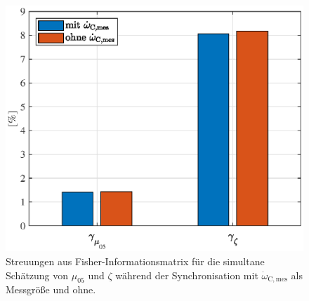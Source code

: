 \begin{figure}[ht]
  \centering
 \includegraphics[scale=0.9]{figures/03_Sensitivitaetsanalyse/03_Fisher_Info/Sync/mue05_zeta_Sync.eps}
  \caption{Streuungen aus Fisher-Informationsmatrix für die simultane Schätzung von $\mu_{05}$ und $\zeta$ während der Synchronisation mit $\dot{\omega}_\mathrm{C,mes}$ als Messgröße und ohne.}
  \label{fig:mue05_zeta_Sync}
\end{figure}